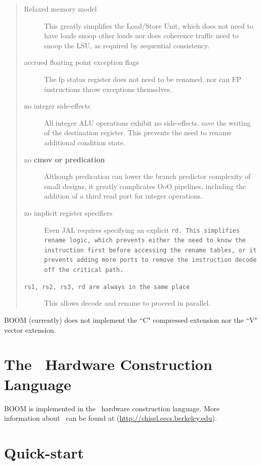 \begin{quote}
\begin{description}
\item [Relaxed memory model] This greatly simplifies the Load/Store Unit, which does not need to have loads snoop other loads nor does coherence traffic need to snoop the LSU, as required by sequential consistency.
\item [accrued floating point exception flags] The fp status register does not need to be renamed, nor can FP instructions throw exceptions themselves. 
\item [no integer side-effects] All integer ALU operations exhibit no side-effects, save the writing of the destination register. This prevents the need to rename additional condition state.
\item [no \bf{cmov} or predication] Although predication can lower the branch predictor complexity of small designs, it greatly complicates OoO pipelines, including the addition of a third read port for integer operations.
\item [no implicit register specifiers] Even JAL requires specifying an explicit \tt{rd}. This simplifies rename logic, which prevents either the need to know the instruction first before accessing the rename tables, or it prevents adding more ports to remove the instruction decode off the critical path.
\item [\tt{rs1}, \tt{rs2}, \tt{rs3}, \tt{rd} are always in the same place] This allows decode and rename to proceed in parallel. 

\end{description}
\end{quote}

BOOM (currently) does not implement the ``C" compressed extension nor the ``V" vector extension.

\section{The \Chisel\ Hardware Construction Language}

BOOM is implemented in the \Chisel\ hardware construction language.  More information about \Chisel\ can be found at (\url{http://chisel.eecs.berkeley.edu}). 

\newpage

\section{Quick-start}


